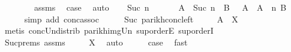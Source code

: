 \begin{isabellebody}
\ \ \isamarkupfalse%
\ {}\isanewline
\ \ \isamarkupfalse%
\ assms\ \isamarkupfalse%
\ {\isacharquery}{\kern0pt}case\ \isamarkupfalse%
\ auto\isanewline
{}\isamarkupfalse%
\isanewline
\ \ \isamarkupfalse%
\ {\isacharparenleft}{\kern0pt}Suc\ n{\isacharparenright}{\kern0pt}\isanewline
\ \ \isamarkupfalse%
\ \isamarkupfalse%
\ {\isachardoublequoteopen}{\isasymPsi}\ {\isacharparenleft}{\kern0pt}A\ {\isacharcircum}{\kern0pt}{\isacharcircum}{\kern0pt}\ {\isacharparenleft}{\kern0pt}Suc\ n{\isacharparenright}{\kern0pt}\ {\isacharat}{\kern0pt}{\isacharat}{\kern0pt}\ B{\isacharparenright}{\kern0pt}\ {\isasymsubseteq}\ {\isasymPsi}\ {\isacharparenleft}{\kern0pt}A\ {\isacharat}{\kern0pt}{\isacharat}{\kern0pt}\ A\ {\isacharcircum}{\kern0pt}{\isacharcircum}{\kern0pt}\ n\ {\isacharat}{\kern0pt}{\isacharat}{\kern0pt}B{\isacharparenright}{\kern0pt}{\isachardoublequoteclose}\isanewline
\ \ \ \ \isamarkupfalse%
\ {\isacharparenleft}{\kern0pt}simp\ add{\isacharcolon}{\kern0pt}\ conc{\isacharunderscore}{\kern0pt}assoc{\isacharparenright}{\kern0pt}\isanewline
\ \ \isamarkupfalse%
\ \isamarkupfalse%
\ Suc\ parikh{\isacharunderscore}{\kern0pt}conc{\isacharunderscore}{\kern0pt}left\ \isamarkupfalse%
\ {\isachardoublequoteopen}{\isasymdots}\ {\isasymsubseteq}\ {\isasymPsi}\ {\isacharparenleft}{\kern0pt}A\ {\isacharat}{\kern0pt}{\isacharat}{\kern0pt}\ X{\isacharparenright}{\kern0pt}{\isachardoublequoteclose}\isanewline
\ \ \ \ \isamarkupfalse%
\ {\isacharparenleft}{\kern0pt}metis\ conc{\isacharunderscore}{\kern0pt}Un{\isacharunderscore}{\kern0pt}distrib{\isacharparenleft}{\kern0pt}{}{\isacharparenright}{\kern0pt}\ parikh{\isacharunderscore}{\kern0pt}img{\isacharunderscore}{\kern0pt}Un\ sup{\isachardot}{\kern0pt}orderE\ sup{\isachardot}{\kern0pt}orderI{\isacharparenright}{\kern0pt}\isanewline
\ \ \isamarkupfalse%
\ \isamarkupfalse%
\ Suc{\isachardot}{\kern0pt}prems\ assms\ \isamarkupfalse%
\ {\isachardoublequoteopen}{\isasymdots}\ {\isasymsubseteq}\ {\isasymPsi}\ X{\isachardoublequoteclose}\ \isamarkupfalse%
\ auto\isanewline
\ \ \isamarkupfalse%
\ \isamarkupfalse%
\ {\isacharquery}{\kern0pt}case\ \isamarkupfalse%
\ fast\isanewline
{}\isamarkupfalse%

\end{isabellebody}
